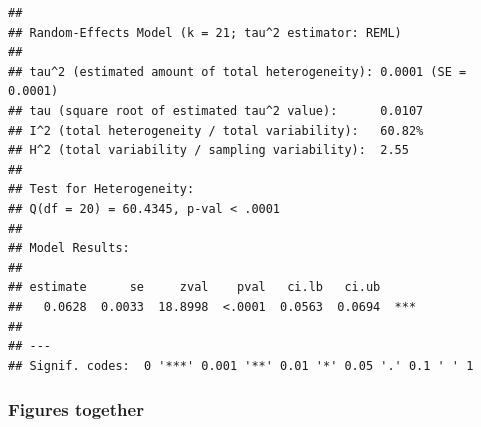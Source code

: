 \documentclass[
]{article}
\newenvironment{Shaded}{\begin{snugshade}}{\end{snugshade}}
\newcommand{\AttributeTok}[1]{\textcolor[rgb]{0.77,0.63,0.00}{#1}}
\newcommand{\DecValTok}[1]{\textcolor[rgb]{0.00,0.00,0.81}{#1}}
\newcommand{\FunctionTok}[1]{\textcolor[rgb]{0.00,0.00,0.00}{#1}}
\newcommand{\NormalTok}[1]{#1}
\newcommand{\OtherTok}[1]{\textcolor[rgb]{0.56,0.35,0.01}{#1}}
\newcommand{\SpecialCharTok}[1]{\textcolor[rgb]{0.00,0.00,0.00}{#1}}
\newcommand{\StringTok}[1]{\textcolor[rgb]{0.31,0.60,0.02}{#1}}
\begin{document}
\begin{Shaded}
\end{Shaded}

\begin{verbatim}
## 
## Random-Effects Model (k = 21; tau^2 estimator: REML)
## 
## tau^2 (estimated amount of total heterogeneity): 0.0001 (SE = 0.0001)
## tau (square root of estimated tau^2 value):      0.0107
## I^2 (total heterogeneity / total variability):   60.82%
## H^2 (total variability / sampling variability):  2.55
## 
## Test for Heterogeneity:
## Q(df = 20) = 60.4345, p-val < .0001
## 
## Model Results:
## 
## estimate      se     zval    pval   ci.lb   ci.ub 
##   0.0628  0.0033  18.8998  <.0001  0.0563  0.0694  *** 
## 
## ---
## Signif. codes:  0 '***' 0.001 '**' 0.01 '*' 0.05 '.' 0.1 ' ' 1
\end{verbatim}

\hypertarget{figures-together}{%
\subsubsection{Figures together}\label{figures-together}}
\end{document}
